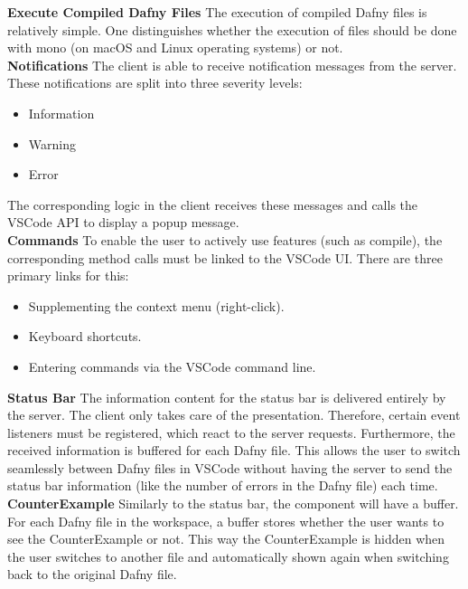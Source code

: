 {\bf Execute Compiled Dafny Files} \textendash{}
The execution of compiled Dafny files is relatively simple.
One distinguishes whether the execution of  files should be done with mono (on macOS and Linux operating systems) or not. \\

{\bf Notifications} \textendash{}
The client is able to receive notification messages from the server.
These notifications are split into three severity levels:
\begin{itemize}
    \item Information
    \item Warning
    \item Error
\end{itemize}
The corresponding logic in the client receives these messages and calls the VSCode API to display a popup message. \\

{\bf Commands} \textendash{}
To enable the user to actively use features (such as compile),
the corresponding method calls must be linked to the VSCode UI.
There are three primary links for this:
\begin{itemize}
    \item Supplementing the context menu (right-click).
    \item Keyboard shortcuts.
    \item Entering commands via the VSCode command line.
\end{itemize}

{\bf Status Bar} \textendash{}
The information content for the status bar is delivered entirely by the server.
The client only takes care of the presentation.
Therefore, certain event listeners must be registered, which react to the server requests.
Furthermore, the received information is buffered for each Dafny file.
This allows the user to switch seamlessly between Dafny files in VSCode
without having the server to send the status bar information
(like the number of errors in the Dafny file) each time.\\

{\bf CounterExample} \textendash{}
Similarly to the status bar, the  component will have a buffer.
For each Dafny file in the workspace, a buffer stores whether the user wants to see the CounterExample or not.
This way the CounterExample is hidden when the user switches to another file
and automatically shown again when switching back to the original Dafny file.

